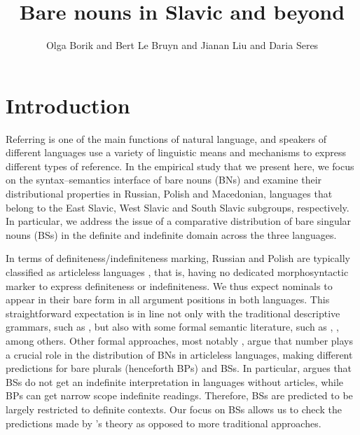 \documentclass[output=paper,colorlinks,citecolor=brown]{langscibook}
\author{Olga Borik\orcid{0000-0003-1255-5962}\affiliation{Universidad Nacional de Educacion a Distancia} and Bert Le Bruyn\orcid{0000-0001-9090-7383}\affiliation{Utrecht University} and Jianan Liu\orcid{}\affiliation{Utrecht University} and Daria Seres\orcid{0000-0002-9044-8516}\affiliation{University of Graz} }
\title{Bare nouns in Slavic and beyond}
\begin{document}
\maketitle

%

\section{Introduction}\label{intro}
Referring is one of the main functions of natural language, and speakers of different languages use a variety of linguistic means and mechanisms to express different types of reference. %
In the empirical study that we present here, we focus on the syntax--semantics interface of bare nouns (BNs) and examine their distributional properties in Russian, Polish and Macedonian, languages that belong to the East Slavic, West Slavic and South Slavic subgroups, respectively. In particular, we address the issue of a comparative distribution of bare singular nouns (BSs) in the definite and indefinite domain across the three languages. 

In terms of definiteness/indefiniteness marking, Russian and Polish are typically classified as articleless languages \citep{wals}, that is, having no dedicated morphosyntactic marker to express definiteness or indefiniteness. We thus expect nominals to appear in their bare form in all argument positions in both languages. This straightforward expectation is in line not only with the traditional descriptive grammars, such as \citet{bor+:Svedova1980}, but also with some formal semantic literature, such as \citet{Chierchia1998}, \citet{Geist2010}, among others. Other formal approaches, most notably \citet{Dayal2004,Dayal2018}, argue that number plays a crucial role in the distribution of BNs in articleless languages, making different predictions for bare plurals (henceforth BPs) and BSs. In particular, \citet{Dayal2004} argues that BSs do not get an indefinite interpretation in languages without articles, while BPs can get narrow scope indefinite readings. Therefore, BSs are predicted to be largely restricted to definite contexts. Our focus on BSs allows us to check the predictions made by \citeauthor{Dayal2004}'s theory as opposed to more traditional approaches. 
\end{document}
